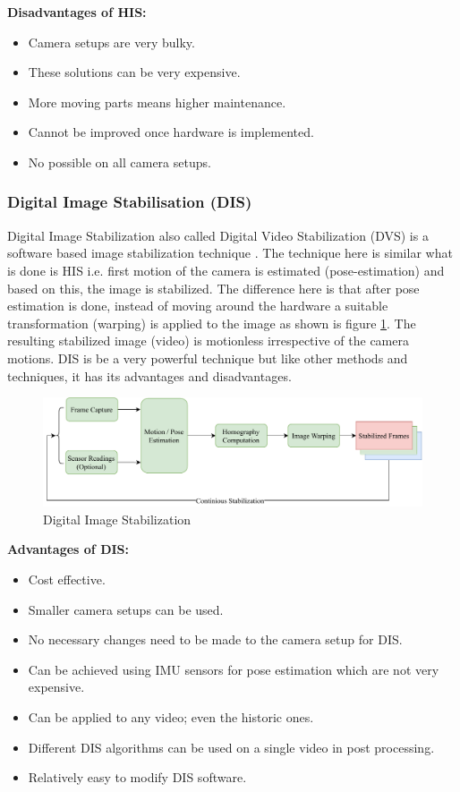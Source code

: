 \textbf{Disadvantages of HIS:}
\begin{itemize}
\item Camera setups are very bulky.
\item These solutions can be very expensive.
\item More moving parts means higher maintenance.
\item Cannot be improved once hardware is implemented.
\item No possible on all camera setups.
\end{itemize}

\subsubsection{Digital Image Stabilisation (DIS)}
Digital Image Stabilization also called Digital Video Stabilization (DVS) is a software based image stabilization technique \citep{dis_review}. The technique here is similar what is done is HIS i.e. first motion of the camera is estimated (pose-estimation) and based on this, the image is stabilized. The difference here is that after pose estimation is done, instead of moving around the hardware a suitable transformation (warping) is applied to the image \citep{dis_feat_track} as shown is figure \ref{fig:dis}. The resulting stabilized image (video) is motionless irrespective of the camera motions. DIS is be a very powerful technique but like other methods and techniques, it has its advantages and disadvantages.

\begin{figure}
\centering
\includegraphics[scale=0.6]{images/fig_chapter2/2_1_dis.pdf}
\caption{Digital Image Stabilization}
\label{fig:dis}
\end{figure}

\textbf{Advantages of DIS: }
\begin{itemize}
\item Cost effective.
\item Smaller camera setups can be used.
\item No necessary changes need to be made to the camera setup for DIS.
\item Can be achieved using IMU sensors for pose estimation which are not very expensive.
\item Can be applied to any video; even the historic ones.
\item Different DIS algorithms can be used on a single video in post processing.
\item Relatively easy to modify DIS software.
\end{itemize}

